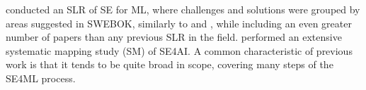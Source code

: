 \textcite{Giray2021} conducted an SLR of SE for ML, where challenges and solutions were grouped by areas suggested in SWEBOK, similarly to \cite{Kumeno2020} and \cite{Nascimento2020}, while including an even greater number of papers than any previous SLR in the field.
\textcite{MartinezFernandez2021} performed an extensive systematic mapping study (SM) of SE4AI.
A common characteristic of previous work is that it tends to be quite broad in scope, covering many steps of the SE4ML process.

